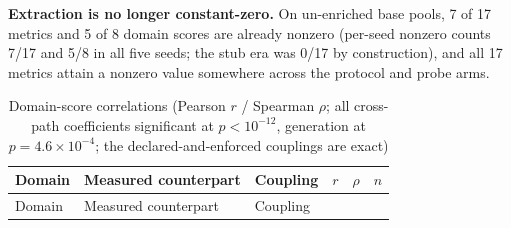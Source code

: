 \documentclass[
  11pt,
]{article}
\begin{document}
\textbf{Extraction is no longer constant-zero.} On un-enriched base
pools, 7 of 17 metrics and 5 of 8 domain scores are already nonzero
(per-seed nonzero counts 7/17 and 5/8 in all five seeds; the stub era
was 0/17 by construction), and all 17 metrics attain a nonzero value
somewhere across the protocol and probe arms.

\begin{longtable}[]{@{}
  >{\raggedright\arraybackslash}p{}
  >{\raggedright\arraybackslash}p{}
  >{\raggedright\arraybackslash}p{}
  >{\raggedright\arraybackslash}p{}
  >{\raggedright\arraybackslash}p{}
  >{\raggedright\arraybackslash}p{}@{}}
\caption{Domain-score correlations (Pearson \(r\) / Spearman \(\rho\);
all cross-path coefficients significant at \(p < 10^{-12}\), generation
at \(p = 4.6 \times 10^{-4}\); the declared-and-enforced couplings are
exact)}\tabularnewline
\toprule\noalign{}
\begin{minipage}[b]{\linewidth}\raggedright
Domain
\end{minipage} & \begin{minipage}[b]{\linewidth}\raggedright
Measured counterpart
\end{minipage} & \begin{minipage}[b]{\linewidth}\raggedright
Coupling
\end{minipage} & \begin{minipage}[b]{\linewidth}\raggedright
\(r\)
\end{minipage} & \begin{minipage}[b]{\linewidth}\raggedright
\(\rho\)
\end{minipage} & \begin{minipage}[b]{\linewidth}\raggedright
\(n\)
\end{minipage} \\
\midrule\noalign{}
\endfirsthead
\toprule\noalign{}
\begin{minipage}[b]{\linewidth}\raggedright
Domain
\end{minipage} & \begin{minipage}[b]{\linewidth}\raggedright
Measured counterpart
\end{minipage} & \begin{minipage}[b]{\linewidth}\raggedright
Coupling
\end{minipage} & \begin{minipage}[b]{\linewidth}\raggedright

\end{minipage}
\end{longtable}
\end{document}
